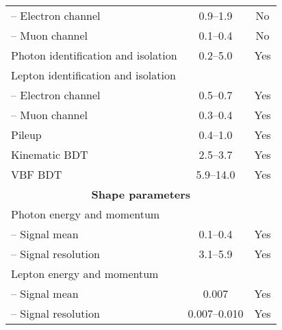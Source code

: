 \begin{table*}[tb!]
{\begin{tabular}{l@{\hskip 0.3in}c@{\hskip 0.3in}c}
  -- Electron  channel                  				                      				    &0.9--1.9	  &     No      \\
  -- Muon channel                       					                     					&0.1--0.4  	 &    No    \\
  Photon identification and isolation                      &    0.2--5.0            			 &  Yes           \\
  Lepton identification and isolation      &       	 	   & \\
  
  -- Electron channel                   			   	                     					&0.5--0.7  	 	 &      Yes      \\
  -- Muon channel                       				   	       					  			&0.3--0.4  	 &          Yes     \\
  Pileup                 				   			   & 0.4--1.0 & Yes            \\
  Kinematic BDT               & 2.5--3.7         				  &  Yes\\
  VBF BDT                            				 			   & 5.9--14.0 &  Yes\\
  \multicolumn{3}{c}{\textbf{Shape parameters}}\\
  Photon energy and momentum					       &&             \\
  -- Signal mean                        						               					 & 0.1--0.4       &      Yes        \\
  -- Signal resolution                        						               		& 3.1--5.9       &      Yes        \\
  Lepton energy and momentum     				 			 				  	  &&          	                 \\
  -- Signal mean                        						       							 & 0.007  &     Yes   \\
  -- Signal resolution                  				  	     							   & 0.007--0.010 &     Yes          \\\hline
  \end{tabular}
  }
  \end{table*}
